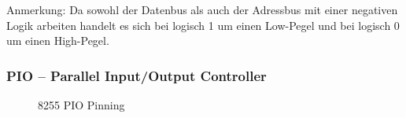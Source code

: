Anmerkung: Da sowohl der Datenbus als auch der Adressbus mit einer negativen Logik arbeiten handelt es sich bei logisch 1 um einen Low-Pegel und bei logisch 0 um einen High-Pegel.

\subsubsection{PIO -- Parallel Input/Output Controller}
\begin{figure}[H]
    \qquad
    \qquad
    \caption[Z80 PIO Pinning]{8255 PIO Pinning \cite{z80:pio}}
    \label{fig:z80-pio-pinning}
\end{figure}

